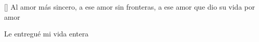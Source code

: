 []
    \beginverse
        Al amor más sincero,
        a ese amor sin fronteras,
        a ese amor que dio su vida por amor

        Le entregué mi vida entera
    \endverse
\endsong